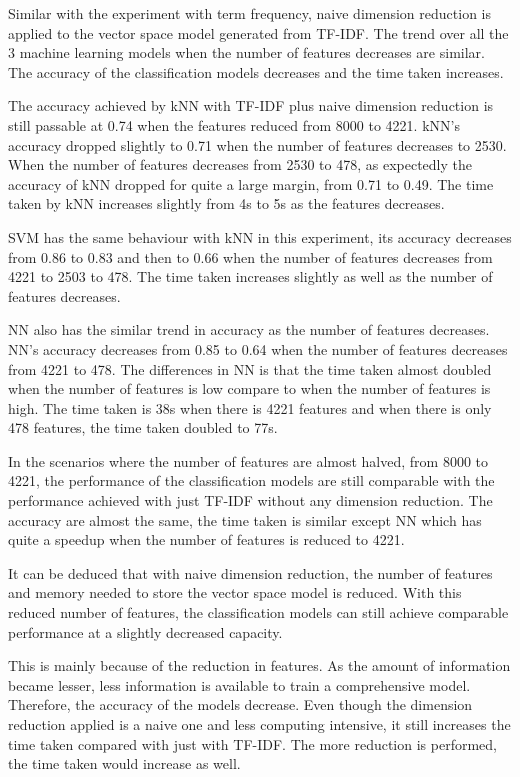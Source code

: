 Similar with the experiment with term frequency, naive dimension reduction is applied to the vector space model generated from TF-IDF. The trend over all the 3 machine learning models when the number of features decreases are similar. The accuracy of the classification models decreases and the time taken increases. 

The accuracy achieved by kNN with TF-IDF plus naive dimension reduction is still passable at 0.74 when the features reduced from 8000 to 4221. kNN's accuracy dropped slightly to 0.71 when the number of features decreases to 2530. When the number of features decreases from 2530 to 478, as expectedly the accuracy of kNN dropped for quite a large margin, from 0.71 to 0.49. The time taken by kNN increases slightly from 4s to 5s as the features decreases.

SVM has the same behaviour with kNN in this experiment, its accuracy decreases from 0.86 to 0.83 and then to 0.66 when the number of features decreases from 4221 to 2503 to 478. The time taken increases slightly as well as the number of features decreases.

NN also has the similar trend in accuracy as the number of features decreases. NN's accuracy decreases from 0.85 to 0.64 when the number of features decreases from 4221 to 478. The differences in NN is that the time taken almost doubled when the number of features is low compare to when the number of features is high. The time taken is 38s when there is 4221 features and when there is only 478 features, the time taken doubled to 77s.

In the scenarios where the number of features are almost halved, from 8000 to 4221, the performance of the classification models are still comparable with the performance achieved with just TF-IDF without any dimension reduction. The accuracy are almost the same, the time taken is similar except NN which has quite a speedup when the number of features is reduced to 4221.

It can be deduced that with naive dimension reduction, the number of features and memory needed to store the vector space model is reduced. With this reduced number of features, the classification models can still achieve comparable performance at a slightly decreased capacity.

This is mainly because of the reduction in features. As the amount of information became lesser, less information is available to train a comprehensive model. Therefore, the accuracy of the models decrease. Even though the dimension reduction applied is a naive one and less computing intensive, it still increases the time taken compared with just with TF-IDF. The more reduction is performed, the time taken would increase as well.

